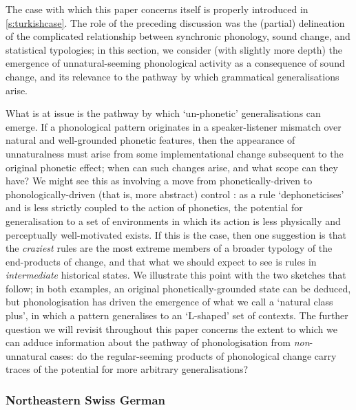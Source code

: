 The case with which this paper concerns itself is properly introduced in \cref{s:turkishcase}. The role of the preceding discussion was the (partial) delineation of the complicated relationship between synchronic phonology, sound change, and statistical typologies; in this section, we consider (with slightly more depth) the emergence of unnatural-seeming phonological activity as a consequence of sound change, and its relevance to the pathway by which grammatical generalisations arise.

What is at issue is the pathway by which `un-phonetic' generalisations can emerge. If a phonological pattern originates in a speaker-listener mismatch over natural and well-grounded phonetic features, then the appearance of unnaturalness must arise from some implementational change subsequent to the original phonetic effect; when can such changes arise, and what scope can they have? We might see this as involving a move from phonetically-driven to phonologically-driven (that is, more abstract) control \citep{Kiparsky1995,Janda2003}: as a rule `dephoneticises' and is less strictly coupled to the action of phonetics, the potential for generalisation to a set of environments in which its action is less physically and perceptually well-motivated exists. If this is the case, then one suggestion is that the \emph{craziest} \citep{Bach1972} rules are the most extreme members of a broader typology of the end-products of change, and that what we should expect to see is rules in \emph{intermediate} historical states. We illustrate this point with the two sketches that follow; in both examples, an original phonetically-grounded state can be deduced, but phonologisation has driven the emergence of what we call a `natural class plus', in which a pattern generalises to an `L-shaped' set of contexts. The further question we will revisit throughout this paper concerns the extent to which we can adduce information about the pathway of phonologisation from \emph{non}-unnatural cases: do the regular-seeming products of phonological change carry traces of the potential for more arbitrary generalisations?

\subsubsection{Northeastern Swiss German}\label{ss:schaffhausen}

